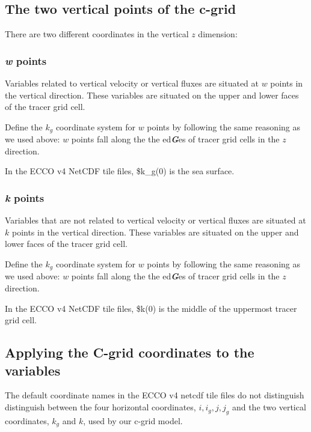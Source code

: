\documentclass[11pt]{article}
\begin{document}
\subsection{The two vertical points of the
c-grid}\label{the-two-vertical-points-of-the-c-grid}

There are two different coordinates in the vertical \(z\) dimension:

\subsubsection{\texorpdfstring{\emph{w}
points}{w points}}\label{w-points}

Variables related to vertical velocity or vertical fluxes are situated
at \(w\) points in the vertical direction. These variables are situated
on the upper and lower faces of the tracer grid cell.

Define the \(k_g\) coordinate system for \(w\) points by following the
same reasoning as we used above: \(w\) points fall along the the
ed\textbf{\emph{G}}es of tracer grid cells in the \(z\) direction.

In the ECCO v4 NetCDF tile files, \$k\_g(0) is the sea surface.

\subsubsection{\texorpdfstring{\emph{k}
points}{k points}}\label{k-points}

Variables that are not related to vertical velocity or vertical fluxes
are situated at \(k\) points in the vertical direction. These variables
are situated on the upper and lower faces of the tracer grid cell.

Define the \(k_g\) coordinate system for \(w\) points by following the
same reasoning as we used above: \(w\) points fall along the the
ed\textbf{\emph{G}}es of tracer grid cells in the \(z\) direction.

In the ECCO v4 NetCDF tile files, \$k(0) is the middle of the uppermost
tracer grid cell.

\subsection{Applying the C-grid coordinates to the
variables}\label{applying-the-c-grid-coordinates-to-the-variables}

The default coordinate names in the ECCO v4 netcdf tile files do not
distinguish distinguish between the four horizontal coordinates,
\(i, i_g, j, j_g\) and the two vertical coordinates, \(k_g\) and \(k\),
used by our c-grid model.
\end{document}
